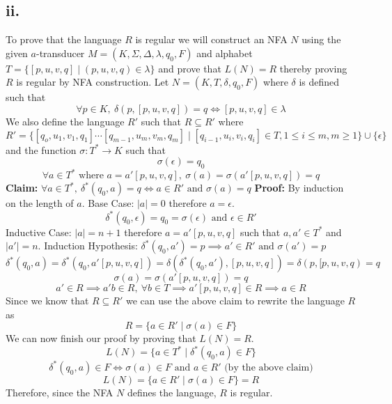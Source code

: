 \documentclass[12pt]{article}
\begin{document}
\subsection*{ii.}
To prove that the language $R$ is regular we will construct an NFA $N$ using
the given $a$-transducer $M = (K, \Sigma, \Delta, \lambda, q_0, F)$ and alphabet
$T = \{[p,u,v,q] \mid (p,u,v,q) \in \lambda\}$ and prove that $L(N) = R$ thereby
proving $R$ is regular by NFA construction. Let $N = (K, T, \delta, q_0, F)$
where $\delta$ is defined such that
$$\forall p \in K,\ \delta(p, [p,u,v,q]) = q \iff [p,u,v,q] \in \lambda$$
We also define the language $R'$ such that $R \subseteq R'$ where
$$R' = \{[q_o, u_1,v_1,q_1] \cdots [q_{m-1},u_m,v_m,q_m] \mid
[q_{i-1},u_i,v_i,q_i] \in T, 1 \le i \le m, m \ge 1\} \cup \{\epsilon\}$$
and the function $\sigma : T^* \rightarrow K$ such that
$$\sigma(\epsilon) = q_0$$
$$\forall a \in T^* \text{ where }
a = a'[p,u,v,q],\ \sigma(a) = \sigma(a'[p,u,v,q]) = q$$
\textbf{Claim: } $\forall a \in T^*,\ \delta^*(q_0, a) = q \iff a \in R'
\text{ and } \sigma(a) = q$
\newline
\textbf{Proof: } By induction on the length of $a$.
\newline
Base Case: $|a| = 0$ therefore $a = \epsilon$.
$$\delta^*(q_0, \epsilon) = q_0 = \sigma(\epsilon) \text{ and }\epsilon \in R'$$
Inductive Case: $|a| = n+1$ therefore $a = a'[p,u,v,q]$ such that $a,a' \in T^*$
and $|a'| = n$.
Induction Hypothesis: $\delta^*(q_0, a') = p \implies a' \in R' \text{ and }
\sigma(a') = p$
$$ \delta^*(q_0, a) = \delta^*(q_0, a'[p,u,v,q]) =
\delta(\delta^*(q_0, a') ,[p,u,v,q]) = \delta(p, [p,u,v,q) = q$$
$$\sigma(a) = \sigma(a'[p,u,v,q]) = q$$
$$a' \in R \implies a'b \in R,\ \forall b \in T \implies a'[p,u,v,q] \in R
\implies a \in R$$
Since we know that $R \subseteq R'$ we can use the above claim to rewrite the
language $R$ as $$R = \{a \in R' \mid \sigma(a) \in F\}$$
We can now finish our proof by proving that $L(N) = R$.
$$L(N) = \{a \in T^* \mid \delta^*(q_0, a) \in F\}$$
$$\delta^*(q_0, a) \in F \iff \sigma(a) \in F \text{ and } a \in R'
\text{ (by the above claim)}$$
$$L(N) = \{a \in R' \mid \sigma(a) \in F\} = R$$
Therefore, since the NFA $N$ defines the language, $R$ is regular.
\end{document}
